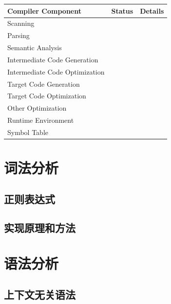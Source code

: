 \documentclass{article}
\begin{document}
\begin{table}[H]
    \begin{tabular}{|l|l|l|}
        \hline
        \textbf{Compiler Component}    & \textbf{Status} & \textbf{Details} \\ \hline
        Scanning                       &                 &                  \\ \hline
        Parsing                        &                 &                  \\ \hline
        Semantic Analysis              &                 &                  \\ \hline
        Intermediate Code Generation   &                 &                  \\ \hline
        Intermediate Code Optimization &                 &                  \\ \hline
        Target Code Generation         &                 &                  \\ \hline
        Target Code Optimization       &                 &                  \\ \hline
        Other Optimization             &                 &                  \\ \hline
        Runtime Environment            &                 &                  \\ \hline
        Symbol Table                   &                 &                  \\ \hline
    \end{tabular}
\end{table}

\section{词法分析}
\subsection{正则表达式}
\subsection{实现原理和方法}

\section{语法分析}
\subsection{上下文无关语法}
\end{document}
